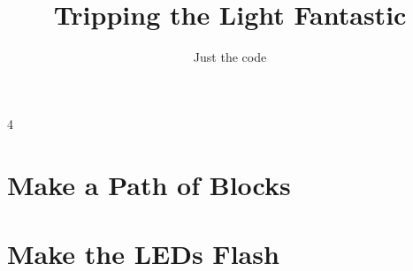 \documentclass{geocraft-worksheet}
\begin{document}
\title{Tripping the Light Fantastic}
\subtitle{Just the code}

\date{}

\maketitle

\setcounter {section} {4}

\section{Make a Path of Blocks}\vspace{-0.8cm}
\lstset{language=Python}

\noindent%
%
\vspace{0.2cm}
%
%

\section{Make the LEDs Flash}\vspace{-0.8cm}

\noindent%
%
\vspace{0.2cm}
%
%
\end{document}
